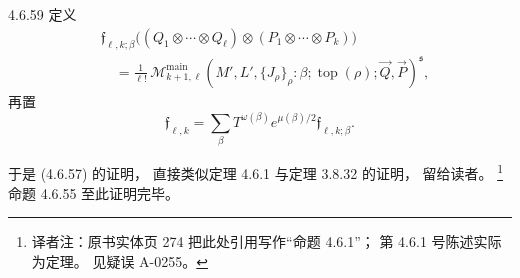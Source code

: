 \begin{definition}{4.6.59}\label{def:4-6-59}
定义
\[
\begin{aligned}
&\mathfrak f_{\ell,k;\beta}
\bigl((Q_1\otimes\cdots\otimes Q_\ell)
\otimes(P_1\otimes\cdots\otimes P_k)\bigr)\\
&\quad=
\frac{1}{\ell!}\,
\mathcal M_{k+1,\ell}^{\mathrm{main}}
(M',L',\{J_\rho\}_\rho:\beta;\operatorname{top}(\rho);
 \vec Q,\vec P)^{\mathfrak s},
\end{aligned}
\]
再置
\[
\mathfrak f_{\ell,k}
=\sum_\beta T^{\omega(\beta)}
 e^{\mu(\beta)/2}\mathfrak f_{\ell,k;\beta}.
\]
\end{definition}

于是 (4.6.57) 的证明，
直接类似定理 4.6.1 与定理 3.8.32 的证明，
留给读者。
\footnote{译者注：原书实体页 274
把此处引用写作“命题 4.6.1”；
第 4.6.1 号陈述实际为定理。
见疑误 A-0255。}
命题 4.6.55 至此证明完毕。
